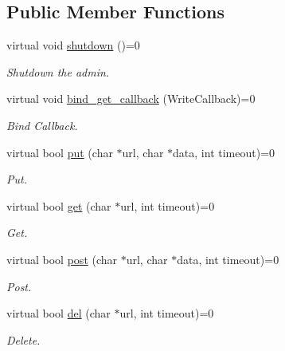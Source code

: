 \subsection*{Public Member Functions}
\begin{DoxyCompactItemize}
\item 
\hypertarget{classHttpInterface_a3ac819dcec45535bf3c0fa614c5bdfce}{virtual void \hyperlink{classHttpInterface_a3ac819dcec45535bf3c0fa614c5bdfce}{shutdown} ()=0}\label{classHttpInterface_a3ac819dcec45535bf3c0fa614c5bdfce}

\begin{DoxyCompactList}\small\item\em Shutdown the admin. \end{DoxyCompactList}\item 
\hypertarget{classHttpInterface_ac5a64589f4c4b68c4feedc58497b7c06}{virtual void \hyperlink{classHttpInterface_ac5a64589f4c4b68c4feedc58497b7c06}{bind\-\_\-get\-\_\-callback} (Write\-Callback)=0}\label{classHttpInterface_ac5a64589f4c4b68c4feedc58497b7c06}

\begin{DoxyCompactList}\small\item\em Bind Callback. \end{DoxyCompactList}\item 
virtual bool \hyperlink{classHttpInterface_af8e2e93e5affacd9420db0b6b0cb24db}{put} (char $\ast$url, char $\ast$data, int timeout)=0
\begin{DoxyCompactList}\small\item\em Put. \end{DoxyCompactList}\item 
virtual bool \hyperlink{classHttpInterface_a3f93eec08da2e42f14f2b23d18636442}{get} (char $\ast$url, int timeout)=0
\begin{DoxyCompactList}\small\item\em Get. \end{DoxyCompactList}\item 
virtual bool \hyperlink{classHttpInterface_a717a51a28818ff835a057d17cbeb32c1}{post} (char $\ast$url, char $\ast$data, int timeout)=0
\begin{DoxyCompactList}\small\item\em Post. \end{DoxyCompactList}\item 
virtual bool \hyperlink{classHttpInterface_af3d4141c2ec53c0b2dbb8de8fb22212d}{del} (char $\ast$url, int timeout)=0
\begin{DoxyCompactList}\small\item\em Delete. \end{DoxyCompactList}\end{DoxyCompactItemize}


